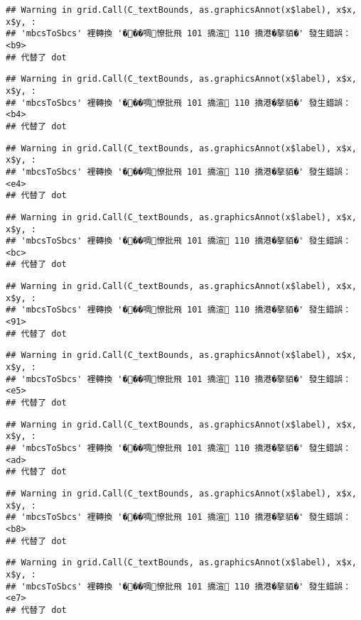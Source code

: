 \documentclass[
]{article}
\begin{document}
\begin{verbatim}
## Warning in grid.Call(C_textBounds, as.graphicsAnnot(x$label), x$x, x$y, :
## 'mbcsToSbcs' 裡轉換 '���啁憭批飛 101 撟渲 110 撟港�摮貊�' 發生錯誤：<b9>
## 代替了 dot
\end{verbatim}

\begin{verbatim}
## Warning in grid.Call(C_textBounds, as.graphicsAnnot(x$label), x$x, x$y, :
## 'mbcsToSbcs' 裡轉換 '���啁憭批飛 101 撟渲 110 撟港�摮貊�' 發生錯誤：<b4>
## 代替了 dot
\end{verbatim}

\begin{verbatim}
## Warning in grid.Call(C_textBounds, as.graphicsAnnot(x$label), x$x, x$y, :
## 'mbcsToSbcs' 裡轉換 '���啁憭批飛 101 撟渲 110 撟港�摮貊�' 發生錯誤：<e4>
## 代替了 dot
\end{verbatim}

\begin{verbatim}
## Warning in grid.Call(C_textBounds, as.graphicsAnnot(x$label), x$x, x$y, :
## 'mbcsToSbcs' 裡轉換 '���啁憭批飛 101 撟渲 110 撟港�摮貊�' 發生錯誤：<bc>
## 代替了 dot
\end{verbatim}

\begin{verbatim}
## Warning in grid.Call(C_textBounds, as.graphicsAnnot(x$label), x$x, x$y, :
## 'mbcsToSbcs' 裡轉換 '���啁憭批飛 101 撟渲 110 撟港�摮貊�' 發生錯誤：<91>
## 代替了 dot
\end{verbatim}

\begin{verbatim}
## Warning in grid.Call(C_textBounds, as.graphicsAnnot(x$label), x$x, x$y, :
## 'mbcsToSbcs' 裡轉換 '���啁憭批飛 101 撟渲 110 撟港�摮貊�' 發生錯誤：<e5>
## 代替了 dot
\end{verbatim}

\begin{verbatim}
## Warning in grid.Call(C_textBounds, as.graphicsAnnot(x$label), x$x, x$y, :
## 'mbcsToSbcs' 裡轉換 '���啁憭批飛 101 撟渲 110 撟港�摮貊�' 發生錯誤：<ad>
## 代替了 dot
\end{verbatim}

\begin{verbatim}
## Warning in grid.Call(C_textBounds, as.graphicsAnnot(x$label), x$x, x$y, :
## 'mbcsToSbcs' 裡轉換 '���啁憭批飛 101 撟渲 110 撟港�摮貊�' 發生錯誤：<b8>
## 代替了 dot
\end{verbatim}

\begin{verbatim}
## Warning in grid.Call(C_textBounds, as.graphicsAnnot(x$label), x$x, x$y, :
## 'mbcsToSbcs' 裡轉換 '���啁憭批飛 101 撟渲 110 撟港�摮貊�' 發生錯誤：<e7>
## 代替了 dot
\end{verbatim}
\end{document}
